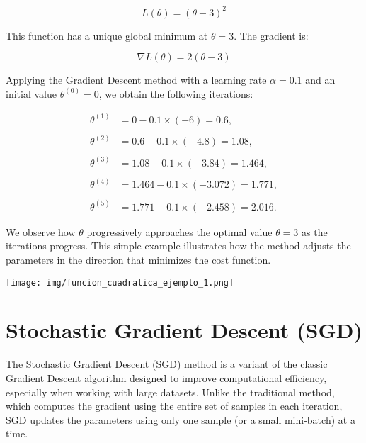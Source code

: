 \documentclass[12pt, letterpaper,conference]{IEEEtran}
\begin{document}
\[
L(\theta) = (\theta - 3)^2
\]

This function has a unique global minimum at \( \theta = 3 \). The gradient is:

\[
\nabla L(\theta) = 2(\theta - 3)
\]

Applying the Gradient Descent method with a learning rate \( \alpha = 0.1 \) and an initial value \( \theta^{(0)} = 0 \), we obtain the following iterations:

\begin{align*}
\theta^{(1)} &= 0 - 0.1 \times (-6) = 0.6, \\\\
\theta^{(2)} &= 0.6 - 0.1 \times (-4.8) = 1.08, \\\\
\theta^{(3)} &= 1.08 - 0.1 \times (-3.84) = 1.464, \\\\
\theta^{(4)} &= 1.464 - 0.1 \times (-3.072) = 1.771, \\\\
\theta^{(5)} &= 1.771 - 0.1 \times (-2.458) = 2.016.
\end{align*}

We observe how \( \theta \) progressively approaches the optimal value \( \theta = 3 \) as the iterations progress. This simple example illustrates how the method adjusts the parameters in the direction that minimizes the cost function.



\vspace{0.3cm}

\texttt{[image: img/funcion\_cuadratica\_ejemplo\_1.png]}




\vspace{0.25cm}

\section{Stochastic Gradient Descent (SGD)}

The Stochastic Gradient Descent (SGD) method is a variant of the classic Gradient Descent algorithm designed to improve computational efficiency, especially when working with large datasets. Unlike the traditional method, which computes the gradient using the entire set of samples in each iteration, SGD updates the parameters using only one sample (or a small mini-batch) at a time.\cite{scikit-sgd}
\end{document}
